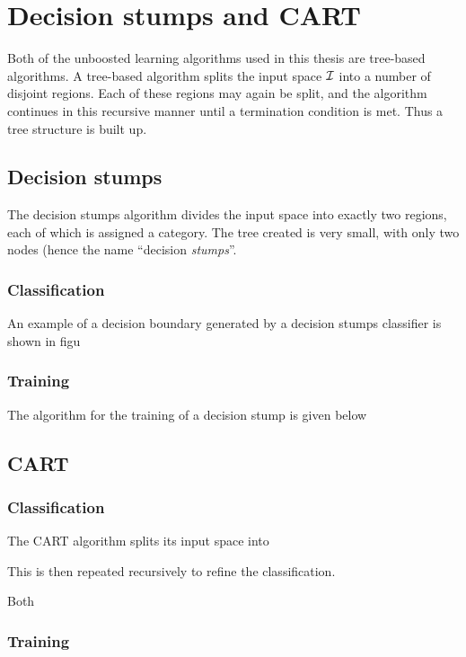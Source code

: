 \section{Decision stumps and CART}

Both of the unboosted learning algorithms used in this thesis are
tree-based algorithms.  A tree-based algorithm splits the input space
$\mathcal{I}$ into a number of disjoint regions.  Each of these regions may
again be split, and the algorithm continues in this recursive manner
until a termination condition is met.  Thus a tree structure is built
up.

\subsection{Decision stumps}

The decision stumps algorithm divides the input space into exactly two
regions, each of which is assigned a category.  The tree created is
very small, with only two nodes (hence the name ``decision
\emph{stumps}''.

\subsubsection{Classification}

An example of a decision boundary generated by a decision stumps
classifier is shown in figu


\subsubsection{Training}



The algorithm for the training of a decision stump is given below

\subsection{CART}

\subsubsection{Classification}

The CART algorithm splits its input space into 


  This is then repeated recursively to refine
the classification.

Both 

\subsubsection{Training}








